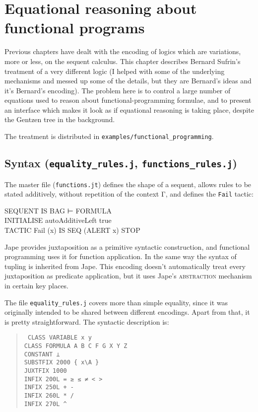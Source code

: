 \chapter{Equational reasoning about functional programs}
\label{chap:funcprog}

Previous chapters have dealt with the encoding of logics which are variations, more or less, on the sequent calculus. This chapter describes Bernard Sufrin's treatment of a very different logic (I helped with some of the underlying mechanisms and messed up some of the details, but they are Bernard's ideas and it's Bernard's encoding). The problem here is to control a large number of equations used to reason about functional-programming formulae, and to present an interface which makes it look as if equational reasoning is taking place, despite the Gentzen tree in the background. 

The treatment is distributed in \texttt{examples/functional\_programming}. 

\section{Syntax (\texttt{equality\_rules.j}, \texttt{functions\_rules.j})}

The master file (\texttt{functions.jt}) defines the shape of a sequent, allows rules to be stated additively, without repetition of the context Γ, and defines the \texttt{Fail} tactic:
\begin{japeish}
SEQUENT IS BAG ⊢ FORMULA \\
INITIALISE autoAdditiveLeft true \\
TACTIC Fail (x) IS SEQ (ALERT x) STOP
\end{japeish}

Jape provides juxtaposition as a primitive syntactic construction, and functional programming uses it for function application. In the same way the syntax of tupling is inherited from Jape. This encoding doesn't automatically treat every juxtaposition as predicate application, but it uses Jape's \textsc{abstraction} mechanism in certain key places.

The file \texttt{equality\_rules.j} covers more than simple equality, since it was originally intended to be shared between different encodings. Apart from that, it is pretty straightforward. The syntactic description is:
\begin{quote}\tt\small
CLASS VARIABLE x y \\
CLASS FORMULA A B C F G X Y Z \\
CONSTANT ⊥ \\
 
SUBSTFIX    2000 \{ x\;\textbackslash\;A \} \\
JUXTFIX 1000 \\
INFIX       200L    = ≥ ≤ ≠ < > \\
INFIX       250L    + - \\
INFIX       260L    * / \\
INFIX       270L    \textasciicircum \\
\end{quote}

